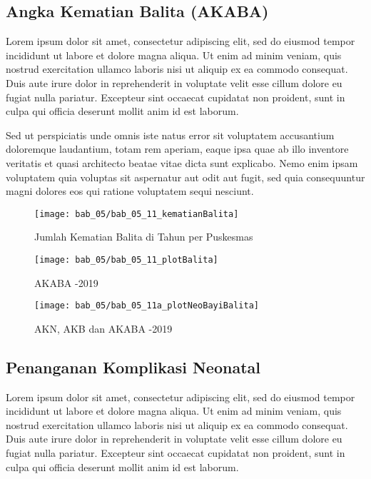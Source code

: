 \subsection{Angka Kematian Balita (AKABA)}
Lorem ipsum dolor sit amet, consectetur adipiscing elit, sed do eiusmod tempor incididunt ut labore et dolore magna aliqua. Ut enim ad minim veniam, quis nostrud exercitation ullamco laboris nisi ut aliquip ex ea commodo consequat. Duis aute irure dolor in reprehenderit in voluptate velit esse cillum dolore eu fugiat nulla pariatur. Excepteur sint occaecat cupidatat non proident, sunt in culpa qui officia deserunt mollit anim id est laborum.

Sed ut perspiciatis unde omnis iste natus error sit voluptatem accusantium doloremque laudantium, totam rem aperiam, eaque ipsa quae ab illo inventore veritatis et quasi architecto beatae vitae dicta sunt explicabo. Nemo enim ipsam voluptatem quia voluptas sit aspernatur aut odit aut fugit, sed quia consequuntur magni dolores eos qui ratione voluptatem sequi nesciunt.

\begin{figure}[H]
    \centering{}
    \texttt{[image: bab\_05/bab\_05\_11\_kematianBalita]}
    \caption{Jumlah Kematian Balita di \namaKabupaten Tahun \tP per Puskesmas}
    \label{fig:Jumlah-Kematian-Balita}
\end{figure}

\begin{figure}[H]
    \centering{}
    \texttt{[image: bab\_05/bab\_05\_11\_plotBalita]}
    \caption{AKABA -2019}
    \label{fig:AKABA-2015-2019}
\end{figure}

\begin{figure}[H]
    \centering{}
    \texttt{[image: bab\_05/bab\_05\_11a\_plotNeoBayiBalita]}
    \caption{AKN, AKB dan AKABA -2019}
    \label{fig:AKABA-2015-2019}
\end{figure}

\subsection{Penanganan Komplikasi Neonatal}
Lorem ipsum dolor sit amet, consectetur adipiscing elit, sed do eiusmod tempor incididunt ut labore et dolore magna aliqua. Ut enim ad minim veniam, quis nostrud exercitation ullamco laboris nisi ut aliquip ex ea commodo consequat. Duis aute irure dolor in reprehenderit in voluptate velit esse cillum dolore eu fugiat nulla pariatur. Excepteur sint occaecat cupidatat non proident, sunt in culpa qui officia deserunt mollit anim id est laborum.

